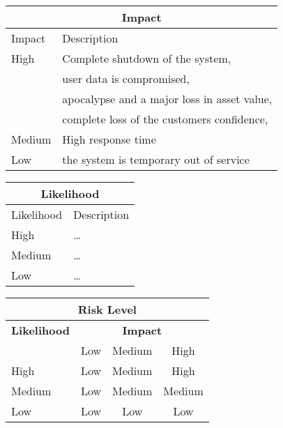 \begin{center}
\begin{tabular}{|l|l|}
\hline
\multicolumn{2}{|c|}{\bf Impact} \\
\hline
Impact & Description \\
\hline
\hline
High & Complete shutdown of the system, \\
     & user data is compromised, \\
     & apocalypse and a major loss in asset value,\\
     & complete loss of the customers confidence, \\
     
\hline
Medium & High response time \\
\hline
Low   & the system is temporary out of service\\
\hline
\end{tabular}
%
%
\begin{tabular}{|l|l|}
\hline
\multicolumn{2}{|c|}{\bf Likelihood} \\
\hline
Likelihood & Description \\
\hline
\hline
High   & \hspace*{20pt}\ldots \\
\hline
Medium & \hspace*{20pt}\ldots \\
\hline
Low   & \hspace*{20pt}\ldots \\
\hline
\end{tabular}
\end{center}

\vspace{5mm}

\begin{center}
\begin{tabular}{|l|c|c|c|}
\hline
\multicolumn{4}{|c|}{{\bf Risk Level}} \\
\hline
{{\bf Likelihood}} & \multicolumn{3}{c|}{{\bf Impact}} \\ %
     & Low & Medium & High \\  \hline
 High & Low & Medium & High  \\
\hline
 Medium & Low & Medium & Medium \\
\hline
 Low & Low & Low & Low \\
\hline
\end{tabular}
\end{center}

